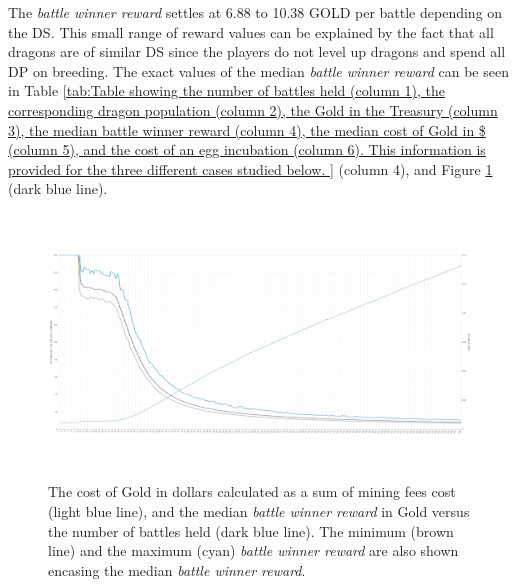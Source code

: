 \documentclass[12pt]{article}
\begin{document}
{%


The \textit{battle winner reward} settles at 6.88 to 10.38 GOLD per battle depending on the DS\textit{.} This small range of reward values can be explained by the fact that all dragons are of similar DS since the players do not level up dragons and spend all DP on breeding. The exact values of the median \textit{battle winner reward }can be seen in  Table \ref{tab:Table showing the number of battles held (column 1), the corresponding dragon population (column 2), the Gold in the Treasury (column 3), the median battle winner reward (column 4), the median cost of Gold in $ (column 5), and the cost of an egg incubation (column 6).  This information is provided for the three different cases studied below. } (column 4), and Figure \ref{fig:The cost of Gold in dollars calculated as a sum of mining fees cost (light blue line), and the median battle reward in Gold versus the number of battles held (dark blue line).} (dark blue line).\par




\begin{figure}[H]
	\begin{Center}
		\includegraphics[width=6.27in,height=2.76in]{./media/CS1nimage23.png}
		\caption{The cost of Gold in dollars calculated as a sum of mining fees cost (light blue line), and the median {\it battle winner reward} in Gold versus the number of battles held (dark blue line).  The minimum (brown line) and the maximum (cyan) {\it battle winner reward} are also shown encasing the median {\it battle winner reward}.}
		\label{fig:The cost of Gold in dollars calculated as a sum of mining fees cost (light blue line), and the median battle reward in Gold versus the number of battles held (dark blue line).}
	\end{Center}
\end{figure}


}
\end{document}
